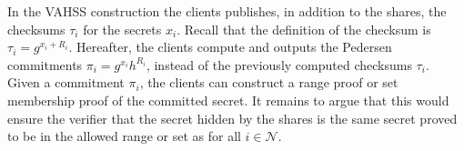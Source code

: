 

In the VAHSS construction the clients publishes, in addition to the shares,  the checksums $\tau_i$ for the secrets $x_i$. Recall that the definition of the checksum is  $\tau_i=g^{x_i+R_i}$. %
Hereafter, the clients compute and outputs the Pedersen commitments $\pi_i=g^{x_i}h^{R_i}$, instead of the previously computed checksums $\tau_i$.  Given a commitment $\pi_i$, the clients can construct a range proof or set membership proof of the committed secret. It remains to argue that this would ensure the verifier that the secret hidden by the shares is the same secret proved to be in the allowed range or set as for all $i\in\mathcal{N}$.



